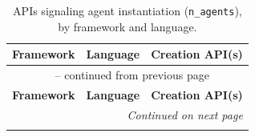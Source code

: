 
{\footnotesize
\renewcommand{\arraystretch}{0.9}
\begin{longtable}{@{}p{}p{}p{}@{}}
\caption{APIs signaling agent instantiation (\texttt{n\_agents}), by framework and language.}
\label{tab:agent-creation-apis} \\
\toprule
\textbf{Framework} & \textbf{Language} & \textbf{Creation API(s)} \\
\midrule
\endfirsthead
\multicolumn{3}{c}{\tablename\ \thetable{} -- continued from previous page} \\
\toprule
\textbf{Framework} & \textbf{Language} & \textbf{Creation API(s)} \\
\midrule
\endhead
\midrule
\multicolumn{3}{r}{\textit{Continued on next page}} \\
\endfoot
\bottomrule
\endlastfoot


\end{longtable}}
